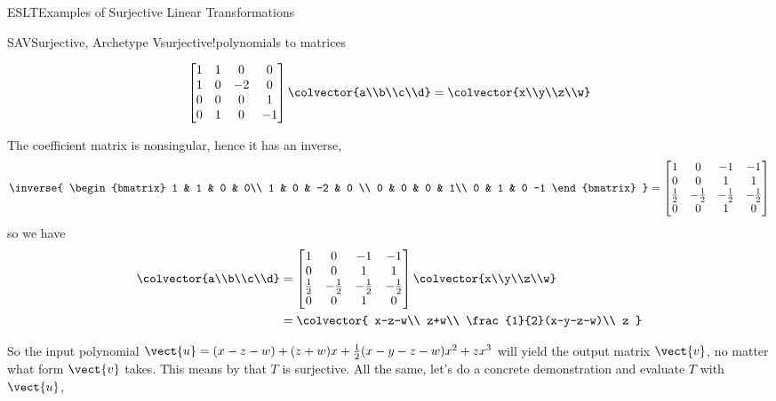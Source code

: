 \begin{subsect}{ESLT}{Examples of Surjective Linear Transformations}
\begin{example}{SAV}{Surjective, Archetype V}{surjective!polynomials to matrices}
\begin{para}
\begin{equation*}
\begin{bmatrix}
1 & 1 & 0 & 0\\
1 & 0 & -2 & 0 \\
0 & 0 & 0 & 1\\
0 & 1 & 0 & -1
\end{bmatrix}
\colvector{a\\b\\c\\d}
=
\colvector{x\\y\\z\\w}
\end{equation*}
\end{para}
%
\begin{para}The coefficient matrix is nonsingular, hence it has an inverse,
%
\begin{equation*}
\inverse{
\begin{bmatrix}
1 & 1 & 0 & 0\\
1 & 0 & -2 & 0 \\
0 & 0 & 0 & 1\\
0 & 1 & 0 -1
\end{bmatrix}
}
=
\begin{bmatrix}
1 & 0 & -1 & -1\\
0 & 0 & 1 & 1\\
\frac{1}{2} & -\frac{1}{2} & -\frac{1}{2} & -\frac{1}{2}\\
0 & 0 & 1 & 0
\end{bmatrix}
\end{equation*}
%
so we have
%
\begin{align*}
\colvector{a\\b\\c\\d}&=
\begin{bmatrix}
1 & 0 & -1 & -1\\
0 & 0 & 1 & 1\\
\frac{1}{2} & -\frac{1}{2} & -\frac{1}{2} & -\frac{1}{2}\\
0 & 0 & 1 & 0
\end{bmatrix}
\colvector{x\\y\\z\\w}\\%
&=
\colvector{
x-z-w\\
z+w\\
\frac{1}{2}(x-y-z-w)\\
z
}
%
\end{align*}
\end{para}
%
\begin{para}So the input polynomial $\vect{u}=(x-z-w)+(z+w)x+\frac{1}{2}(x-y-z-w)x^2+zx^3$ will yield the output matrix $\vect{v}$, no matter what form $\vect{v}$ takes.  This means by  that $T$ is surjective.  All the same, let's do a concrete demonstration and evaluate $T$ with $\vect{u}$,

\end{para}
\end{example}
\end{subsect}
